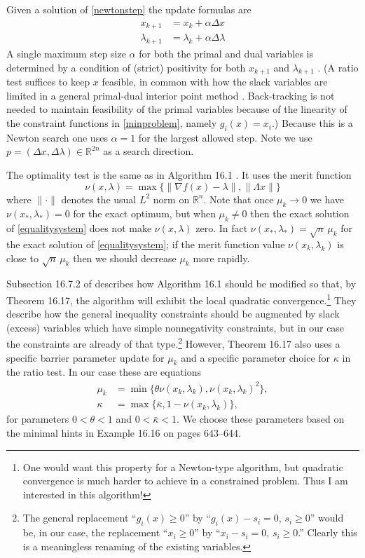 \documentclass[11pt]{article}
\newcommand{\RR}{\mathbb{R}}
\newcommand{\grad}{\nabla}
\begin{document}
Given a solution of \eqref{newtonstep} the update formulas are
\begin{align*}
x_{k+1} &= x_k + \alpha \Delta x \\
\lambda_{k+1} &= \lambda_k + \alpha \Delta \lambda
\end{align*}
A single maximum step size $\alpha$ for both the primal and dual variables is determined by a condition of (strict) positivity for both $x_{k+1}$ and $\lambda_{k+1}$ \cite{NocedalWright2006}.  (A ratio test suffices to keep $x$ feasible, in common with how the slack variables are limited in a general primal-dual interior point method \cite[subsection 16.7.2]{GrivaNashSofer2009}.  Back-tracking is not needed to maintain feasibility of the primal variables because of the linearity of the constraint functions in \eqref{minproblem}, namely $g_i(x)=x_i$.)  Because this is a Newton search one uses $\alpha=1$ for the largest allowed step.  Note we use $p=(\Delta x,\Delta \lambda) \in \RR^{2n}$ as a search direction.

The optimality test is the same as in Algorithm 16.1 \cite{GrivaNashSofer2009}.  It uses the merit function
\begin{equation}
    \nu(x,\lambda) = \max\{\|\grad f(x)-\lambda\|,\|\Lambda x\|\}  \label{merit}
\end{equation}
where $\|\cdot\|$ denotes the usual $L^2$ norm on $\RR^n$.  Note that once $\mu_k\to 0$ we have $\nu(x_*,\lambda_*) = 0$ for the exact optimum, but when $\mu_k \ne 0$ then the exact solution of \eqref{equalitysystem} does not make $\nu(x,\lambda)$ zero.  In fact $\nu(x_*,\lambda_*) = \sqrt{n}\, \mu_k$ for the exact solution of \eqref{equalitysystem}; if the merit function value $\nu(x_k,\lambda_k)$ is close to $\sqrt{n}\, \mu_k$ then we should decrease $\mu_k$ more rapidly.

Subsection 16.7.2 of \cite{GrivaNashSofer2009} describes how Algorithm 16.1 should be modified so that, by Theorem 16.17, the algorithm will exhibit the local quadratic convergence.\footnote{One would want this property for a Newton-type algorithm, but quadratic convergence is much harder to achieve in a constrained problem.  Thus I am interested in this algorithm!}  They describe how the general inequality constraints should be augmented by slack (excess) variables which have simple nonnegativity constraints, but in our case the constraints are already of that type.\footnote{The general replacement ``$g_i(x)\ge 0$'' by ``$g_i(x) - s_i =0$, $s_i\ge 0$'' would be, in our case, the replacement ``$x_i\ge 0$'' by ``$x_i-s_i=0$, $s_i\ge 0$.''  Clearly this is a meaningless renaming of the existing variables.}  However, Theorem 16.17 also uses a specific barrier parameter update for $\mu_k$ and a specific parameter choice for $\kappa$ in the ratio test.  In our case these are equations
\begin{align*}
\mu_k &= \min\{\theta \nu(x_k,\lambda_k),\nu(x_k,\lambda_k)^2\}, \\
\kappa &= \max\{\bar\kappa,1-\nu(x_k,\lambda_k)\},
\end{align*}
for parameters $0<\theta<1$ and $0<\bar\kappa<1$.  We choose these parameters based on the minimal hints in Example 16.16 on pages 643--644.
\end{document}
